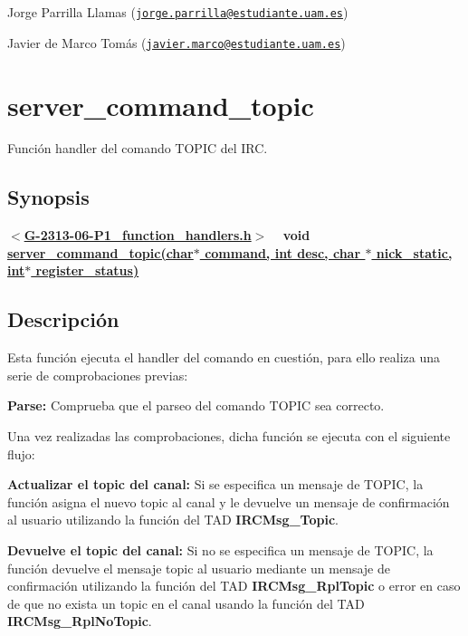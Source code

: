 \begin{DoxyItemize}
\item Jorge Parrilla Llamas (\href{mailto:jorge.parrilla@estudiante.uam.es}{\tt jorge.\+parrilla@estudiante.\+uam.\+es}) 
\item Javier de Marco Tomás (\href{mailto:javier.marco@estudiante.uam.es}{\tt javier.\+marco@estudiante.\+uam.\+es}) 
\end{DoxyItemize}\hypertarget{server_command_topic}{}\section{server\+\_\+command\+\_\+topic}\label{server_command_topic}
Función handler del comando T\+O\+P\+IC del I\+RC.\hypertarget{server_command_topic_synopsis_topic}{}\subsection{Synopsis}\label{server_command_topic_synopsis_topic}
{ {\bfseries $<$\hyperlink{G-2313-06-P1__function__handlers_8h}{G-\/2313-\/06-\/\+P1\+\_\+function\+\_\+handlers.\+h}$>$} ~\newline
 {\bfseries void \hyperlink{G-2313-06-P1__function__handlers_8c_a894ae019e03841e9d54fdad31d79f218}{server\+\_\+command\+\_\+topic(char$\ast$ command, int desc, char $\ast$ nick\+\_\+static, int$\ast$ register\+\_\+status)}} } \hypertarget{server_command_topic_descripcion_topic}{}\subsection{Descripción}\label{server_command_topic_descripcion_topic}
Esta función ejecuta el handler del comando en cuestión, para ello realiza una serie de comprobaciones previas\+:


\begin{DoxyItemize}
\item {\bfseries Parse\+:} Comprueba que el parseo del comando T\+O\+P\+IC sea correcto. 
\end{DoxyItemize}

Una vez realizadas las comprobaciones, dicha función se ejecuta con el siguiente flujo\+:


\begin{DoxyItemize}
\item {\bfseries Actualizar el topic del canal\+:} Si se especifica un mensaje de T\+O\+P\+IC, la función asigna el nuevo topic al canal y le devuelve un mensaje de confirmación al usuario utilizando la función del T\+AD {\bfseries I\+R\+C\+Msg\+\_\+\+Topic}.  
\item {\bfseries Devuelve el topic del canal\+:} Si no se especifica un mensaje de T\+O\+P\+IC, la función devuelve el mensaje topic al usuario mediante un mensaje de confirmación utilizando la función del T\+AD {\bfseries I\+R\+C\+Msg\+\_\+\+Rpl\+Topic} o error en caso de que no exista un topic en el canal usando la función del T\+AD {\bfseries I\+R\+C\+Msg\+\_\+\+Rpl\+No\+Topic}.  
\end{DoxyItemize}

